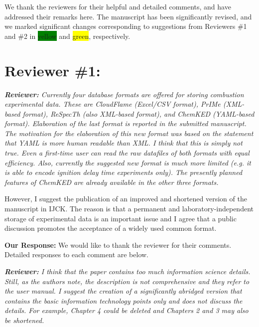 \documentclass[a4paper,10pt]{elsarticle}
\providecommand{\hly}[1]{\colorbox{yellow}{#1}}
\providecommand{\hlg}[1]{\colorbox{green}{#1}}
\newenvironment{reviewer}{\vspace{0.5\baselineskip}\begingroup\itshape\textbf{Reviewer:}}{\endgroup\vspace{0.5\baselineskip}}
\newenvironment{response}{\vspace{0.5\baselineskip}\textbf{Our Response:}}{\vspace{0.5\baselineskip}}
\begin{document}
We thank the reviewers for their helpful and detailed comments, and have addressed their remarks here.
The manuscript has been significantly revised, and we marked significant changes corresponding to suggestions from Reviewers \#1 and \#2 in \hlg{yellow} and \hly{green}, respectively.


\section*{Reviewer \#1:}

\begin{reviewer}
    Currently four database formats are offered for storing combustion experimental data. These are
    CloudFlame (Excel/CSV format), PrIMe (XML-based format), ReSpecTh (also XML-based format), and
    ChemKED (YAML-based format). Elaboration of the last format is reported in the submitted
    manuscript. The motivation for the elaboration of this new format was based on the statement
    that YAML is more human readable than XML. I think that this is simply not true. Even a
    first-time user can read the raw datafiles of both formats with equal efficiency. Also,
    currently the suggested new format is much more limited (e.g. it is able to encode ignition
    delay time experiments only). The presently planned features of ChemKED are already available in
    the other three formats.

    However, I suggest the publication of an improved and shortened version of the manuscript in
    IJCK. The reason is that a permanent and laboratory-independent storage of experimental data is
    an important issue and I agree that a public discussion promotes the acceptance of a widely used
    common format.
\end{reviewer}

\begin{response}
    We would like to thank the reviewer for their comments. Detailed responses to each comment are
    below.
\end{response}

\begin{reviewer}
    I think that the paper contains too much information science details. Still, as the authors
    note, the description is not comprehensive and they refer to the user manual. I suggest the
    creation of a significantly abridged version that contains the basic information technology
    points only and does not discuss the details. For example, Chapter 4 could be deleted and
    Chapters 2 and 3 may also be shortened.
\end{reviewer}
\end{document}
